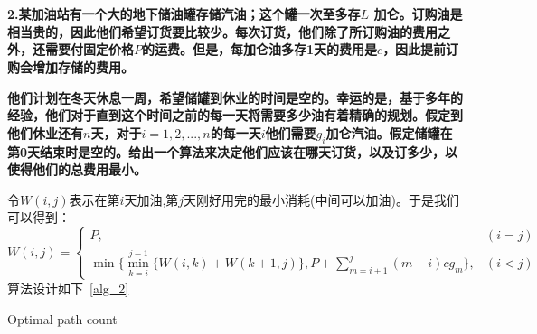 
\chapter{}
\textbf{
2.某加油站有一个大的地下储油罐存储汽油；这个罐一次至多存$L$ 加仑。订购油是相当贵的，因此他们希望订货要比较少。每次订货，他们除了所订购油的费用之外，还需要付固定价格$P$的运费。但是，每加仑油多存1天的费用是$c$，因此提前订购会增加存储的费用。
}

\textbf{
他们计划在冬天休息一周，希望储罐到休业的时间是空的。幸运的是，基于多年的经验，他们对于直到这个时间之前的每一天将需要多少油有着精确的规划。假定到他们休业还有$n$天，对于$i=1,2,...,n$的每一天$i$他们需要$g_i$加仑汽油。假定储罐在第0天结束时是空的。给出一个算法来决定他们应该在哪天订货，以及订多少，以使得他们的总费用最小。
}


令$W(i,j)$表示在第$i$天加油,第$j$天刚好用完的最小消耗(中间可以加油)。于是我们可以得到：
\begin{equation}
W(i,j)=
\left\{
             \begin{array}{lr}
             P,
             & (i=j) \\
             \min\{\min\limits_{k=i}^{j-1}\{W(i,k)+W(k+1,j)\}, P+\sum\limits_{m=i+1}^{j}(m-i)cg_m\},
             & (i<j)
             \end{array}
\right.
\end{equation}
算法设计如下~\ref{alg_2}
\begin{algorithm}
\caption{Optimal path count}
\label{alg_2}
\begin{algorithmic}[1]
    \ENDFOR
\ENDFOR
{}
    \ENDFOR
\ENDFOR

\end{algorithmic}
\end{algorithm}

